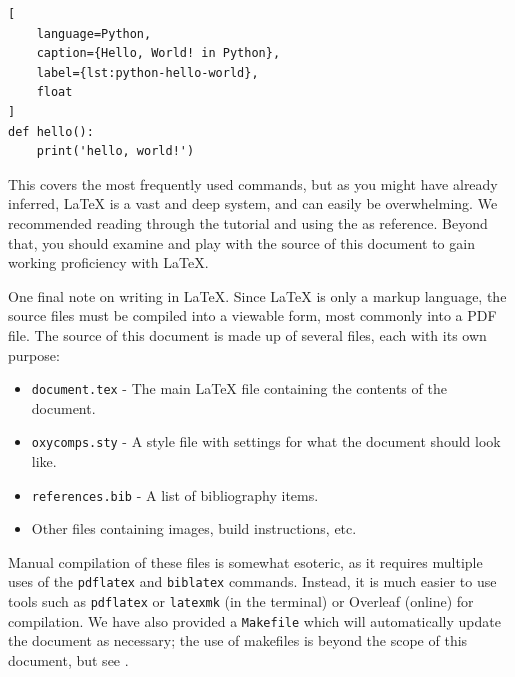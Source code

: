 \documentclass[10pt,twocolumn]{article}
\begin{document}
\begin{lstlisting}[
    language=Python,
    caption={Hello, World! in Python},
    label={lst:python-hello-world},
    float
]
def hello():
    print('hello, world!')
\end{lstlisting}

This covers the most frequently used commands, but as you might have already inferred, LaTeX is a vast and deep system, and can easily be overwhelming.
We recommended reading through the  tutorial \cite{Overleaf2021LearnLaTeXIn} and using the  \cite{WikiBook2022LaTeX} as reference.
Beyond that, you should examine and play with the source of this document to gain working proficiency with LaTeX.

One final note on writing in LaTeX.
Since LaTeX is only a markup language, the source files must be compiled into a viewable form, most commonly into a PDF file.
The source of this document is made up of several files, each with its own purpose:
\begin{itemize}
    \item \texttt{document.tex} - The main LaTeX file containing the contents of the document.
    \item \texttt{oxycomps.sty} - A style file with settings for what the document should look like.
    \item \texttt{references.bib} - A list of bibliography items.
    \item Other files containing images, build instructions, etc.
\end{itemize}
Manual compilation of these files is somewhat esoteric, as it requires multiple uses of the \texttt{pdflatex} and \texttt{biblatex} commands.
Instead, it is much easier to use tools such as \texttt{pdflatex} or \texttt{latexmk} (in the terminal) or Overleaf (online) for compilation.
We have also provided a \texttt{Makefile} which will automatically update the document as necessary; the use of makefiles is beyond the scope of this document, but see \textcite{Lambert2021MakefileTutorial}.
\end{document}
